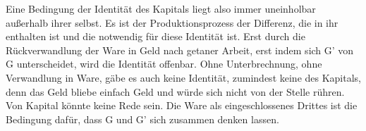 \documentclass[12pt,
               paper=a4,
               twoside=false,
               onehalfspacing,
               bibliography=totoc,
               toc=graduated,
               ]{scrartcl}
\newcommand{\pc}[2]{\parencite[#1]{#2}}
\begin{document}
%
%
%
%


Eine Bedingung der Identität des Kapitals liegt also immer uneinholbar
außerhalb ihrer selbst. Es ist der Produktionsprozess der Differenz,
die in ihr enthalten ist und die notwendig für diese Identität ist.
Erst durch die Rückverwandlung der Ware in Geld nach \glq getaner
Arbeit\grq, erst indem sich G' von G unterscheidet, wird die Identität
offenbar. Ohne Unterbrechnung, ohne Verwandlung in Ware, gäbe es auch
keine Identität, zumindest keine des Kapitals, denn das Geld bliebe
einfach Geld und würde sich nicht von der Stelle rühren. Von Kapital
könnte keine Rede sein. Die Ware als eingeschlossenes Drittes ist die
Bedingung dafür, dass G und G' sich zusammen denken lassen.

\end{document}
